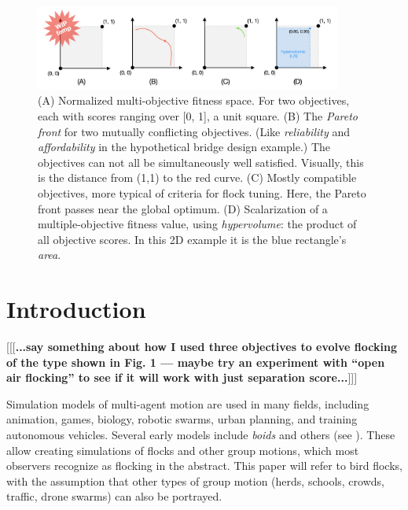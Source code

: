 \documentclass[letterpaper]{article}
\begin{document}


\begin{figure}[t]
    \centering
    \includegraphics[width=0.9\textwidth]{images/temp_MOF_HV.png}
    \caption{(A) Normalized multi-objective fitness space. For two objectives, each with scores ranging over [0, 1], a unit square. (B) The \textit{Pareto front} for two mutually conflicting objectives. (Like \textit{reliability} and \textit{affordability} in the hypothetical bridge design example.) The objectives can not all be simultaneously well satisfied. Visually, this is the distance from (1,1) to the red curve. (C) Mostly compatible objectives, more typical of criteria for flock tuning. Here, the Pareto front passes near the global optimum. (D) Scalarization of a multiple-objective fitness value, using \textit{hypervolume}: the product of all objective scores. In this 2D example it is the blue rectangle's \textit{area}.}
    \label{fig:MOF_HV}
\end{figure}


\section{Introduction}
\label{sec:intro}

[[[\textbf{...say something about how I used three objectives to evolve flocking of the type shown in Fig. 1 --- maybe try an experiment with ``open air flocking'' to see if it will work with just separation score...}]]]

Simulation models of multi-agent motion are used in many fields, including animation, games, biology, robotic swarms, urban planning, and training autonomous vehicles. Several early models include \textit{boids} and others (see ). These allow creating simulations of flocks and other group motions, which most observers recognize as flocking in the abstract. This paper will refer to bird flocks, with the assumption that other types of group motion (herds, schools, crowds, traffic, drone swarms) can also be portrayed.
\end{document}
